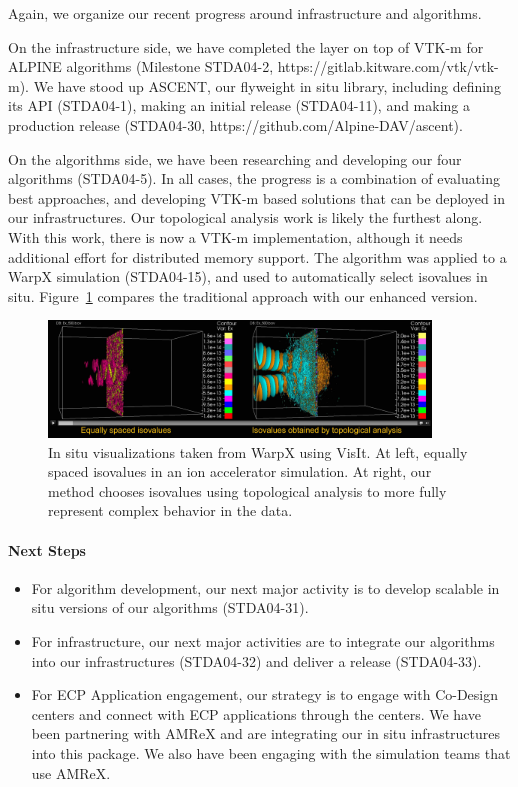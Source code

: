 Again, we organize our recent progress around infrastructure and algorithms.

On the infrastructure side, we have completed the layer on top of VTK-m for ALPINE algorithms (Milestone STDA04-2, https://gitlab.kitware.com/vtk/vtk-m). 
%
We have stood up ASCENT, our flyweight in situ library, including defining its API (STDA04-1), making an initial release (STDA04-11), and making a production release (STDA04-30, https://github.com/Alpine-DAV/ascent).

On the algorithms side, we have been researching and developing our four algorithms (STDA04-5).
%
In all cases, the progress is a combination of evaluating best approaches, and developing VTK-m based solutions that
can be deployed in our infrastructures.
%
Our topological analysis work is likely the furthest along.
%
With this work, there is now a VTK-m implementation, although it needs additional effort for distributed memory support.
%
The algorithm was applied to a WarpX simulation (STDA04-15), and used to automatically select isovalues in situ.
%
Figure~\ref{fig:alpine_topology} compares the traditional approach with our enhanced version.

\begin{figure}[htb]
	\centering
	\includegraphics[width=4in]{projects/2.3.4-DataViz/2.3.4.12-ALPINE/alpine_topology}
	\caption{\label{fig:alpine_topology}In situ visualizations taken from WarpX using VisIt.  At left, equally spaced isovalues in an ion accelerator simulation. At right, our method chooses isovalues using topological analysis to more fully represent complex behavior in the data.}
\end{figure}


\paragraph{Next Steps}

\begin{itemize}
        \setlength{\itemsep}{1pt}
        \setlength{\parskip}{0pt}
        \setlength{\parsep}{0pt}
\item For algorithm development, our next major activity is to develop scalable in situ versions of our algorithms (STDA04-31).
\item For infrastructure, our next major activities are to integrate our algorithms into our infrastructures (STDA04-32) and deliver a release (STDA04-33). 
\item For ECP Application engagement, our strategy is to engage with Co-Design centers and connect with ECP applications through
the centers.  We have been partnering with AMReX and are integrating our in situ infrastructures into this package.  We also
have been engaging with the simulation teams that use AMReX.
\end{itemize}
